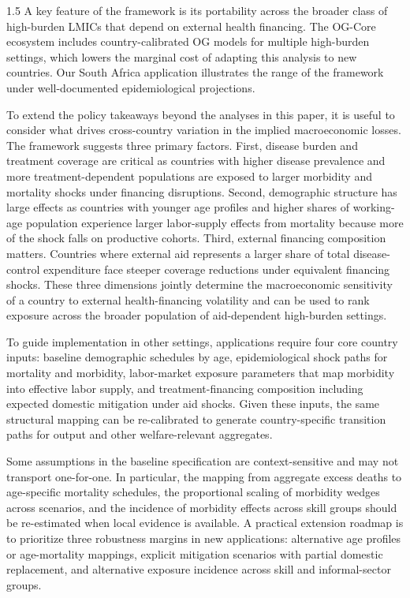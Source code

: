 \documentclass[letterpaper,12pt]{article}
\theoremstyle{definition}
\begin{document}
\begin{spacing}{1.5}
A key feature of the framework is its portability across the broader class of high-burden LMICs that depend on external health financing. The OG-Core ecosystem includes country-calibrated OG models for multiple high-burden settings, which lowers the marginal cost of adapting this analysis to new countries. Our South Africa application illustrates the range of the framework under well-documented epidemiological projections.

To extend the policy takeaways beyond the analyses in this paper, it is useful to consider what drives cross-country variation in the implied macroeconomic losses. The framework suggests three primary factors. First, disease burden and treatment coverage are critical as countries with higher disease prevalence and more treatment-dependent populations are exposed to larger morbidity and mortality shocks under financing disruptions. Second, demographic structure has large effects as countries with younger age profiles and higher shares of working-age population experience larger labor-supply effects from mortality because more of the shock falls on productive cohorts. Third, external financing composition matters. Countries where external aid represents a larger share of total disease-control expenditure face steeper coverage reductions under equivalent financing shocks. These three dimensions jointly determine the macroeconomic sensitivity of a country to external health-financing volatility and can be used to rank exposure across the broader population of aid-dependent high-burden settings.

To guide implementation in other settings, applications require four core country inputs: baseline demographic schedules by age, epidemiological shock paths for mortality and morbidity, labor-market exposure parameters that map morbidity into effective labor supply, and treatment-financing composition including expected domestic mitigation under aid shocks. Given these inputs, the same structural mapping can be re-calibrated to generate country-specific transition paths for output and other welfare-relevant aggregates.

Some assumptions in the baseline specification are context-sensitive and may not transport one-for-one. In particular, the mapping from aggregate excess deaths to age-specific mortality schedules, the proportional scaling of morbidity wedges across scenarios, and the incidence of morbidity effects across skill groups should be re-estimated when local evidence is available. A practical extension roadmap is to prioritize three robustness margins in new applications: alternative age profiles or age-mortality mappings, explicit mitigation scenarios with partial domestic replacement, and alternative exposure incidence across skill and informal-sector groups.


\end{spacing}
\end{document}
